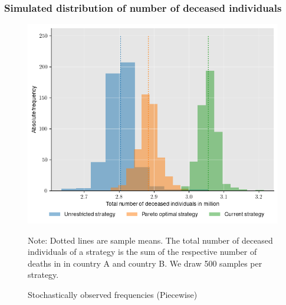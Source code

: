 \subsubsection{Simulated distribution of number of deceased individuals}
\label{A:simulated_distr}
\begin{figure}[h!]
\centering
\includegraphics[scale=0.65]{images/piecewise_stochastic_histogram.png}\\
\begin{flushleft}
\scriptsize{Note:} Dotted lines are sample means. The total number of deceased individuals of a strategy is the sum of the respective number of deaths in in country A and country B. We draw 500 samples per strategy. 
\end{flushleft}
\caption{Stochastically observed frequencies (Piecewise)}
\label{fig:results_piecewise_stochastic_histogram}
\end{figure}


